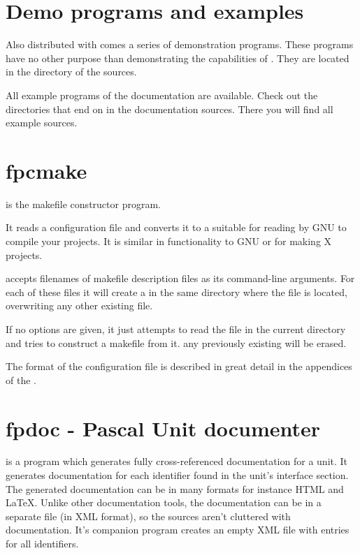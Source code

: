 \section{Demo programs and examples}
Also distributed with \fpc comes a series of demonstration programs.
These programs have no other purpose than demonstrating the capabilities of
\fpc. They are located in the  directory of the sources.

All example programs of the documentation are available. Check out the
directories that end on  in the documentation sources. There you
will find all example sources.

\section{fpcmake}

 is the \fpc makefile constructor program.

It reads a  configuration file and converts it to a
 suitable for reading by GNU  to compile
your projects. It is similar in functionality to GNU 
or  for making X projects.

 accepts filenames of makefile description files as its
command-line arguments. For each of these files it will create a
 in the same directory where the file is located,
overwriting any other existing file.

If no options are given, it just attempts to read the file 
in the current directory and tries to construct a makefile from it.
any previously existing  will be erased.

The format of the  configuration file is described in great
detail in the appendices of the \progref.

\section{fpdoc - Pascal Unit documenter}

 is a program which generates fully cross-referenced
documentation for a unit. It generates documentation for each 
identifier found in the unit's interface section. The generated 
documentation can be in many formats for instance HTML and LaTeX. 
Unlike other documentation tools, the documentation can be in a separate
file (in XML format), so the sources aren't cluttered with documentation.
It's companion program  creates an empty XML file with
entries for all identifiers.

